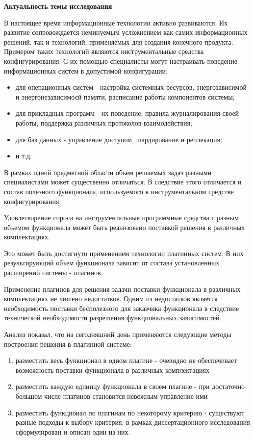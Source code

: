 \textbf{Актуальность темы исследования}


В настоящее время информационные технологии активно развиваются. Их развитие сопровождается неминуемым усложнением как самих информационных решений, так и технологий, применяемых для создания конечного продукта. Примером таких технологий являются инструментальные средства конфигурирования. С их помощью специалисты могут настраивать поведение информационных систем в допустимой конфигурации:
\begin{itemize}
    \item для операционных систем - настройка системных ресурсов, энергозависимой и энергонезависимосй памяти, расписание работы компонентов системы;
    \item для прикладных программ - их поведение, правила журналирования своей работы, поддержка различных протоколов взаимодействия;
    \item для баз данных - управление доступом, шардирование и реплекация;
    \item и т.д.
\end{itemize}

В рамках одной предметной области объем решаемых задач разными специалистами может существенно отличаться. В следствие этого отличается и состав полезного функционала, используемого в инструментальном средстве конфигурирования.

Удовлетворение спроса на инструментальные программные средства с разным объемом функционала может быть реализовано поставкой решения в различных комплектациях.

Это может быть достигнуто применением технологии плагинных систем. В них результирующий объем функционала зависит от состава установленных расширений системы - плагинов.

Применение плагинов для решения задачи поставки функционала в различных комплектациях не лишено недостатков. Одним из недостатков является необходимость поставки бесполезного для заказчика функционала в следствие технической необходимости разрешения функциональных зависимостей.

Анализ показал, что на сегодняшний день применяются следующие методы построения решения в плагинной системе:
\begin{enumerate}
    \item разместить весь функционал в одном плагине - очевидно не обеспечивает возможность поставки функционала в различных комплектациях
    \item разместить каждую единицу функционала в своем плагине - при достаточно большом числе плагинов становится невожным управление ими
    \item разместить функционал по плагинам по некоторому критерию - существуют разные подходы к выбору критерия, в рамках диссертационного исследования сформулирован и описан один из них.
\end{enumerate}

